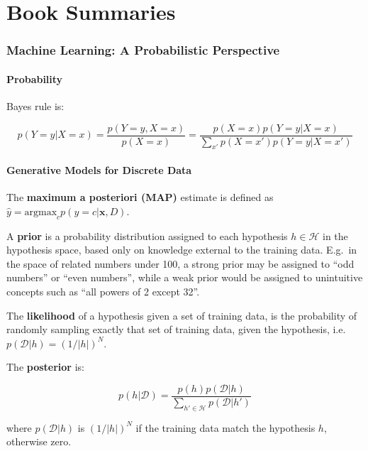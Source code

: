 \documentclass[a4paper, 12pt]{article}
\begin{document}
\part{Book Summaries}


\section{Machine Learning: A Probabilistic Perspective}


\subsection{Probability}

Bayes rule is:

\begin{equation}
        p(Y = y | X = x) = \frac{p(Y = y, X = x)}{p(X = x)}
                = \frac{p(X = x) p(Y = y | X = x)}
                       {\sum_{x'} p(X = x') p(Y = y | X = x')}
\end{equation}


\subsection{Generative Models for Discrete Data}

The \textbf{maximum a posteriori (MAP)} estimate is defined as
$\hat{y} = \textrm{argmax}_{c} p(y = c | \mathbf{x}, D)$.

A \textbf{prior} is a probability distribution assigned to each hypothesis $h
\in \mathcal{H}$ in the hypothesis space, based only on knowledge external to
the training data. E.g.\ in the space of related numbers under 100, a strong
prior may be assigned to ``odd numbers'' or ``even numbers'', while a weak
prior would be assigned to unintuitive concepts such as ``all powers of 2
except 32''.

The \textbf{likelihood} of a hypothesis given a set of training data, is the
probability of randomly sampling exactly that set of training data, given the
hypothesis, i.e. $p{(\mathcal{D} | h)} = {(1 / |h|)}^N$.

The \textbf{posterior} is:

\begin{equation}
        p(h | \mathcal{D})
                = \frac{p(h) p(\mathcal{D} | h)}
                       {\sum_{h' \in \mathcal{H}} p(\mathcal{D} | h')}
\end{equation}

where $p(\mathcal{D} | h)$ is ${(1 / |h|)}^N$ if the training data match the
hypothesis $h$, otherwise zero.
\end{document}
